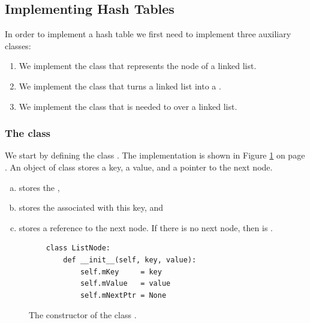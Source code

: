 \subsection{Implementing Hash Tables}
In order to implement a hash table we first need to implement three auxiliary classes:
\begin{enumerate}
\item We implement the class  that represents the node of a linked list.
\item We implement the class  that turns a linked list into a .
\item We implement  the class  that is needed to  over a linked list.
\end{enumerate}

\subsubsection{The class }
We start by defining the class .
The implementation is shown in Figure \ref{fig:ListNode.ipynb} on page \pageref{fig:ListNode.ipynb}.
An object of class  stores a key, a value, and a pointer to the next node.
\begin{enumerate}[(a)]
\item {}     stores the ,
\item {}   stores the  associated with this key, and
\item {} stores a reference to the next node.  If there is no next node, then 
       is .
\end{enumerate}

\begin{figure}[!ht]
\centering
\begin{verbatim}
    class ListNode:
        def __init__(self, key, value):
            self.mKey     = key
            self.mValue   = value
            self.mNextPtr = None                
\end{verbatim}
\vspace*{-0.3cm}
\caption{The constructor of the class .}
\label{fig:ListNode.ipynb}
\end{figure}

